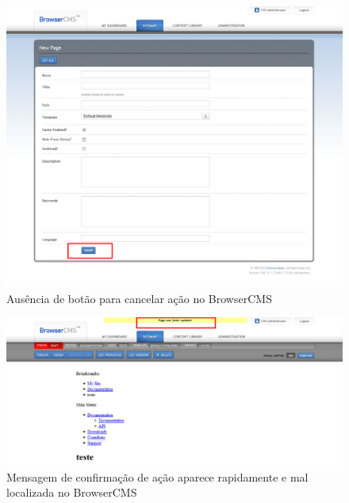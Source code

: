\begin{figure}[here]
\includegraphics[width=150mm]{images/browsercms_erro_cancel.jpg}
\caption{Ausência de botão para cancelar ação no BrowserCMS}
\label{fig:browsercms_erro_cancel}
\end{figure}

\begin{figure}[here]
\includegraphics[width=150mm]{images/browsercms_erro_msg_confirmacao.jpg}
\caption{Mensagem de confirmação de ação aparece rapidamente e mal localizada no BrowserCMS}
\label{fig:browsercms_erro_msg_confirmacao}
\end{figure}

